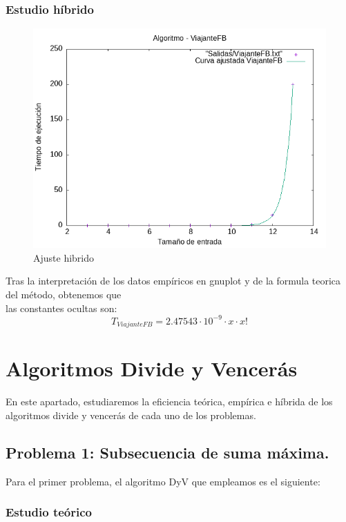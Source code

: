 \documentclass[11pt,openany]{book}
\begin{document}
\subsection{Estudio híbrido}
\begin{center}
      \begin{figure}[H]
            \centering
            \includegraphics[width=0.7\linewidth]{assets/Img/ViajanteFB_hib.png}
            \caption{Ajuste hibrido}
            \label{fig:ViajanteFBhibrido}
      \end{figure}
\end{center}
Tras la interpretación de los datos empíricos en gnuplot y de la formula teorica del método, obtenemos que \\
las constantes ocultas son:
\begin{equation*}
      T_{ViajanteFB}=2.47543 \cdot 10^{-9} \cdot x \cdot x!
\end{equation*}



\chapter{Algoritmos Divide y Vencerás}
En este apartado, estudiaremos la eficiencia teórica, empírica e híbrida de los algoritmos divide y vencerás
de cada uno de los problemas.
\section{Problema 1: Subsecuencia de suma máxima.}
Para el primer problema, el algoritmo DyV que empleamos es el siguiente:
\subsection{Estudio teórico}
\end{document}
